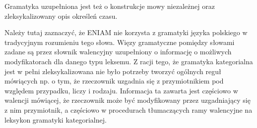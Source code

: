 \documentclass[oneside,pwrcover,withmarginpar,hidelinks,11pt]{article}
\newcommand{\tensor}{\bullet}
\newcommand{\both}{\mid}
\newcommand{\plus}{\oplus}
\newcommand{\one}{1}
\begin{document}
% 

Gramatyka uzupełniona jest też o konstrukcje mowy niezależnej oraz zleksykalizowany opis określeń czasu.

Należy tutaj zaznaczyć, że ENIAM nie korzysta z gramatyki języka polskiego 
w tradycyjnym rozumieniu tego słowa.
Więzy gramatyczne pomiędzy słowami zadane są przez słownik walencyjny uzupełniony o informację
o możliwych modyfikatorach dla danego typu leksemu. Z racji tego, że
gramatyka kategorialna jest w pełni zleksykalizowana nie było potrzeby 
tworzyć ogólnych reguł mówiących np. o tym, że rzeczownik uzgadnia się 
z przymiotnikiem pod względem przypadku, liczy i rodzaju.
Informacja ta zawarta jest częściowo w walencji mówiącej, że 
rzeczownik może być modyfikowany przez uzgadniający się z nim 
przymiotnik, a częściowo w procedurach tłumaczących ramy walencyjne 
na leksykon gramatyki kategorialnej.
\end{document}
